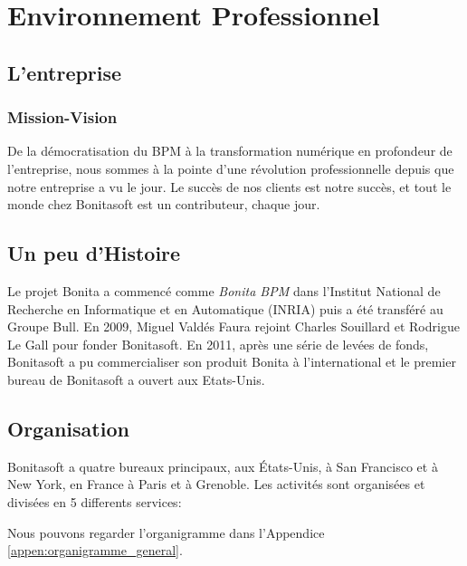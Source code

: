 \section{Environnement Professionnel}
\subsection{L'entreprise}
\subsubsection{Mission-Vision}
De la démocratisation du BPM à la transformation numérique en profondeur de l'entreprise, nous sommes à la pointe d'une révolution professionnelle depuis que notre entreprise a vu le jour.
Le succès de nos clients est notre succès, et tout le monde chez Bonitasoft est un contributeur, chaque jour.
\cite{Bonitasoft2017BONITA}

\subsection{Un peu d'Histoire}
Le projet Bonita a commencé comme \emph{Bonita BPM} dans l'Institut National de Recherche en Informatique et en Automatique (INRIA) puis a été transféré au Groupe Bull.
En 2009, Miguel Valdés Faura rejoint Charles Souillard et Rodrigue Le Gall pour fonder Bonitasoft.
En 2011, après une série de levées de fonds, Bonitasoft a pu commercialiser son produit Bonita à l'international et le premier bureau de Bonitasoft a ouvert aux Etats-Unis.\cite{wikipedia_2018}

\subsection{Organisation}
Bonitasoft a quatre bureaux principaux, aux États-Unis, à San Francisco et à New York, en France à Paris et à Grenoble.
Les activités sont organisées et divisées en 5 differents services:

\begin{center}
\end{center}

Nous pouvons regarder l'organigramme dans l'Appendice \ref{appen:organigramme_general}.







